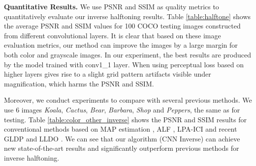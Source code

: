 \documentclass[journal]{IEEEtran}
\begin{document}
\textbf{Quantitative Results.}
We use PSNR and SSIM as quality metrics to quantitatively evaluate our inverse halftoning results. Table \ref{table:halftone} shows the average PSNR and SSIM values for 100 COCO testing images constructed from different convolutional layers.
It is clear that based on these image evaluation metrics, our method can improve the images by a large margin for both color and grayscale images. In our experiment, the best results are produced by the model trained with conv1\_1 layer.
When using perceptual loss based on higher layers gives rise to a slight grid pattern artifacts visible under magnification, which harms the PSNR and SSIM.

Moreover, we conduct experiments to compare with several previous methods. We use 6 images \textit{Koala}, \textit{Cactus}, \textit{Bear}, \textit{Barbara}, \textit{Shop} and \textit{Peppers}, the same as \cite{son2014local} for testing. Table \ref{table:color_other_inverse} shows the PSNR and SSIM results for conventional methods based on MAP estimation \cite{stevenson1997inverse}, ALF \cite{kite2000fast}, LPA-ICI \cite{foi2004inverse} and recent GLDP \cite{son2012inverse} and LLDO \cite{son2014local}. We can see that our algorithm (CNN Inverse) can achieve new state-of-the-art results and significantly outperform previous methods for inverse halftoning.
\end{document}
